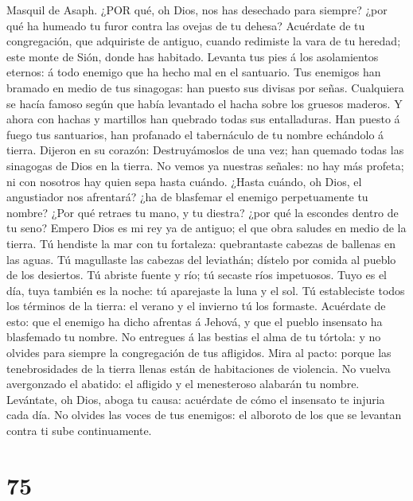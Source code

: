  Masquil de Asaph. ¿POR qué, oh Dios, nos has desechado para
siempre? ¿por qué ha humeado tu furor contra las ovejas de tu dehesa?
 Acuérdate de tu congregación, que adquiriste de antiguo,
cuando redimiste la vara de tu heredad; este monte de Sión, donde has
habitado.  Levanta tus pies á los asolamientos eternos: á
todo enemigo que ha hecho mal en el santuario.  Tus enemigos
han bramado en medio de tus sinagogas: han puesto sus divisas por señas.
 Cualquiera se hacía famoso según que había levantado el
hacha sobre los gruesos maderos.  Y ahora con hachas y
martillos han quebrado todas sus entalladuras.  Han puesto á
fuego tus santuarios, han profanado el tabernáculo de tu nombre
echándolo á tierra.  Dijeron en su corazón: Destruyámoslos
de una vez; han quemado todas las sinagogas de Dios en la tierra.
 No vemos ya nuestras señales: no hay más profeta; ni con
nosotros hay quien sepa hasta cuándo.  ¿Hasta cuándo, oh
Dios, el angustiador nos afrentará? ¿ha de blasfemar el enemigo
perpetuamente tu nombre?  ¿Por qué retraes tu mano, y tu
diestra? ¿por qué la escondes dentro de tu seno?  Empero
Dios es mi rey ya de antiguo; el que obra saludes en medio de la tierra.
 Tú hendiste la mar con tu fortaleza: quebrantaste cabezas
de ballenas en las aguas.  Tú magullaste las cabezas del
leviathán; dístelo por comida al pueblo de los desiertos. 
Tú abriste fuente y río; tú secaste ríos impetuosos.  Tuyo
es el día, tuya también es la noche: tú aparejaste la luna y el sol.
 Tú estableciste todos los términos de la tierra: el verano
y el invierno tú los formaste.  Acuérdate de esto: que el
enemigo ha dicho afrentas á Jehová, y que el pueblo insensato ha
blasfemado tu nombre.  No entregues á las bestias el alma
de tu tórtola: y no olvides para siempre la congregación de tus
afligidos.  Mira al pacto: porque las tenebrosidades de la
tierra llenas están de habitaciones de violencia.  No
vuelva avergonzado el abatido: el afligido y el menesteroso alabarán tu
nombre.  Levántate, oh Dios, aboga tu causa: acuérdate de
cómo el insensato te injuria cada día.  No olvides las
voces de tus enemigos: el alboroto de los que se levantan contra ti sube
continuamente.

\hypertarget{section-74}{%
\section{75}\label{section-74}}

